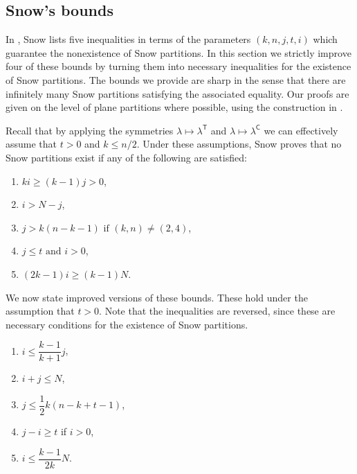 \documentclass{amsart}
\newcommand\C{\mathsf{C}}
\newcommand\T{\mathsf{T}}
\theoremstyle{plain}
\theoremstyle{definition}
\numberwithin{equation}{section}
\begin{document}
\subsection{Snow's bounds}\label{sect:bounds}

In \cite[\S3.4]{Sno86}, Snow lists five inequalities in terms of the parameters $(k,n,j,t,i)$ which guarantee the nonexistence of Snow partitions. In this section we strictly improve four of these bounds by turning them into necessary inequalities for the existence of Snow partitions. The bounds we provide are sharp in the sense that there are infinitely many Snow partitions satisfying the associated equality. Our proofs are given on the level of plane partitions where possible, using the construction in .

Recall that by applying the symmetries $\lambda\mapsto\lambda^\T$ and $\lambda\mapsto\lambda^\C$ we can effectively assume that $t>0$ and $k\leq n/2$. Under these assumptions, Snow proves that no Snow partitions exist if any of the following are satisfied:

\begin{enumerate}[label=(S\arabic*)]
\item $ki\geq(k-1)j>0$, \medskip\label{eq:s1}
\item $i>N-j$, \medskip \label{eq:s2}
\item $j>k(n-k-1)\text{ if }(k,n)\neq (2,4)$, \medskip \label{eq:s3}
\item $j\leq t\text{ and }i>0$, \medskip \label{eq:s4}
\item $(2k-1)i\geq (k-1)N$. \medskip \label{eq:s5}
\end{enumerate}

We now state improved versions of these bounds. These hold under the assumption that $t>0$. Note that the inequalities are reversed, since these are necessary conditions for the existence of Snow partitions.
\begin{enumerate}[label=(P\arabic*)]
\item $i\leq\dfrac{k-1}{k+1}j$, \medskip\label{eq:p1}
\item $i+j\leq N$, \medskip \label{eq:p2}
\item $j\leq\dfrac{1}{2}k(n-k+t-1)$, \medskip \label{eq:p3}
\item $j-i\geq t$ if $i>0$, \medskip \label{eq:p4}
\item $i\leq\dfrac{k-1}{2k}N$. \medskip \label{eq:p5}
\end{enumerate}
\end{document}
